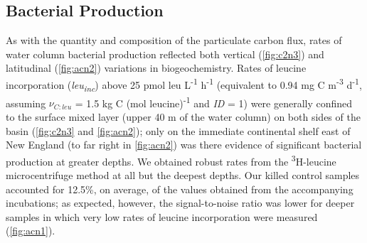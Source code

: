 \subsection{Bacterial Production}
\label{ssec:Bacterial Production}

As with the quantity and composition of the particulate carbon flux, rates of water column bacterial production reflected both vertical (\autoref{fig:c2n3}) and latitudinal (\autoref{fig:acn2}) variations in biogeochemistry. Rates of leucine incorporation (\emph{leu\textsubscript{inc}}) above 25 pmol leu L\textsuperscript{-1} h\textsuperscript{-1} (equivalent to 0.94 mg C m\textsuperscript{-3} d\textsuperscript{-1}, assuming $\nu _{C:leu}$ = 1.5 kg C (mol leucine)\textsuperscript{-1} and \emph{ID} = 1) were generally confined to the surface mixed layer (upper 40 m of the water column) on both sides of the basin (\autoref{fig:c2n3} and \autoref{fig:acn2}); only on the immediate continental shelf east of New England (to far right in \autoref{fig:acn2}) was there evidence of significant bacterial production at greater depths. We obtained robust rates from the \textsuperscript{3}H-leucine microcentrifuge method at all but the deepest depths. Our killed control samples accounted for 12.5\%, on average, of the values obtained from the accompanying incubations; as expected, however, the signal-to-noise ratio was lower for deeper samples in which very low rates of leucine incorporation were measured (\autoref{fig:acn1}).


